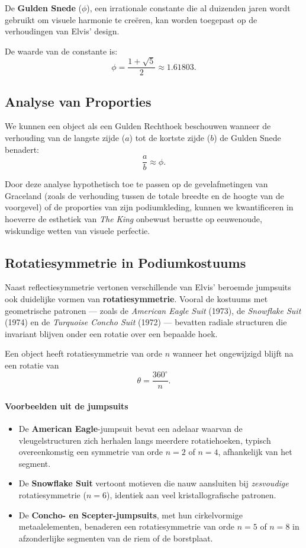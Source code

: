 \documentclass{book}
\begin{document}
De \textbf{Gulden Snede} ($\phi$), een irrationale constante die al duizenden jaren wordt gebruikt om visuele harmonie te cre\"eren, kan worden toegepast op de verhoudingen van Elvis' design.

De waarde van de constante is:
\[
\phi = \frac{1 + \sqrt{5}}{2} \approx 1.61803.
\]

\subsection{Analyse van Proporties}

We kunnen een object als een Gulden Rechthoek beschouwen wanneer de verhouding van de langste zijde ($a$) tot de kortste zijde ($b$) de Gulden Snede benadert:
\[
\frac{a}{b} \approx \phi.
\]

Door deze analyse hypothetisch toe te passen op de gevelafmetingen van Graceland (zoals de verhouding tussen de totale breedte en de hoogte van de voorgevel) of de proporties van zijn podiumkleding, kunnen we kwantificeren in hoeverre de esthetiek van \emph{The King} onbewust berustte op eeuwenoude, wiskundige wetten van visuele perfectie.

\subsection{Rotatiesymmetrie in Podiumkostuums}

Naast reflectiesymmetrie vertonen verschillende van Elvis' beroemde jumpsuits ook duidelijke vormen van 
\textbf{rotatiesymmetrie}. Vooral de kostuums met geometrische patronen --- zoals de \emph{American Eagle Suit} 
(1973), de \emph{Snowflake Suit} (1974) en de \emph{Turquoise Concho Suit} (1972) --- bevatten radiale structuren 
die invariant blijven onder een rotatie over een bepaalde hoek.

Een object heeft rotatiesymmetrie van orde $n$ wanneer het ongewijzigd blijft na een rotatie van
\[
\theta = \frac{360^{\circ}}{n}.
\]

\paragraph{Voorbeelden uit de jumpsuits}

\begin{itemize}
	\item De \textbf{American Eagle}-jumpsuit bevat een adelaar waarvan de vleugelstructuren zich herhalen langs 
	meerdere rotatiehoeken, typisch overeenkomstig een symmetrie van orde $n=2$ of $n=4$, afhankelijk van het segment.
	
	\item De \textbf{Snowflake Suit} vertoont motieven die nauw aansluiten bij \emph{zesvoudige} rotatiesymmetrie 
	($n = 6$), identiek aan veel kristallografische patronen.
	
	\item De \textbf{Concho- en Scepter-jumpsuits}, met hun cirkelvormige metaalelementen, benaderen een rotatiesymmetrie 
	van orde $n=5$ of $n=8$ in afzonderlijke segmenten van de riem of de borstplaat.
\end{itemize}
\end{document}
